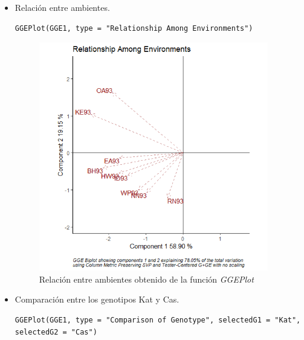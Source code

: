 \begin{itemize}
\item Relación entre ambientes.

\begin{lstlisting}
GGEPlot(GGE1, type = "Relationship Among Environments")
\end{lstlisting}

\begin{figure}[h!]
	\begin{center}
		\includegraphics[width=10cm]{./Graficos/RelationshipAmongEnvironments.png}
	\end{center}
	\caption{Relación entre ambientes obtenido de la función \emph{GGEPlot}}
\end{figure}

\item Comparación entre los genotipos Kat y Cas.

\begin{lstlisting}
GGEPlot(GGE1, type = "Comparison of Genotype", selectedG1 = "Kat", selectedG2 = "Cas")
\end{lstlisting}


\end{itemize}
